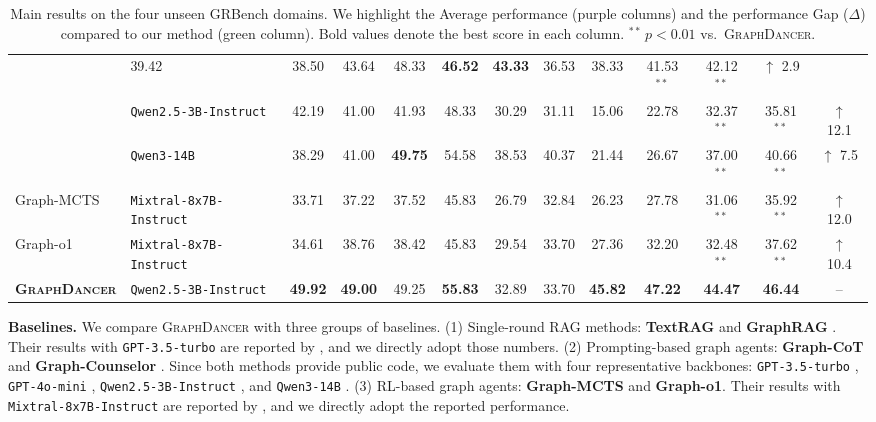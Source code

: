 \documentclass[11pt]{article}
\newcommand{\ours}{\textsc{GraphDancer}\xspace}
\newcommand{\sig}{\kern-0.5pt$^{{\scriptscriptstyle\ast\ast}}$}
\begin{document}
\begin{spacing}{0.985}
\begin{table}[ht]
{\begin{tabular}{llccccccccccc}
 & 39.42 & 38.50 & 43.64 & 48.33 & \textbf{46.52} & \textbf{43.33} & 36.53 & 38.33 & \cellcolor{violet!20}41.53\sig & \cellcolor{violet!20}42.12\sig & \cellcolor{darkgreen!5}$\uparrow$ 2.9 \\
 & \texttt{Qwen2.5-3B-Instruct}
 & 42.19 & 41.00 & 41.93 & 48.33 & 30.29 & 31.11 & 15.06 & 22.78 & \cellcolor{violet!20}32.37\sig & \cellcolor{violet!20}35.81\sig & \cellcolor{darkgreen!20}$\uparrow$ 12.1 \\
 & \texttt{Qwen3-14B}
 & 38.29 & 41.00 & \textbf{49.75} & 54.58 & 38.53 & 40.37 & 21.44 & 26.67 & \cellcolor{violet!20}37.00\sig & \cellcolor{violet!20}40.66\sig & \cellcolor{darkgreen!10}$\uparrow$ 7.5 \\
\midrule
Graph-MCTS \cite{liu2025graphmcts}
 & \texttt{Mixtral-8x7B-Instruct}
 & 33.71 & 37.22 & 37.52 & 45.83 & 26.79 & 32.84 & 26.23 & 27.78 & \cellcolor{violet!20}31.06\sig & \cellcolor{violet!20}35.92\sig & \cellcolor{darkgreen!25}$\uparrow$ 12.0 \\
Graph-o1 \cite{liu2025grapho1}
 & \texttt{Mixtral-8x7B-Instruct}
 & 34.61 & 38.76 & 38.42 & 45.83 & 29.54 & 33.70 & 27.36 & 32.20 & \cellcolor{violet!20}32.48\sig & \cellcolor{violet!20}37.62\sig & \cellcolor{darkgreen!20}$\uparrow$ 10.4 \\
\midrule
%
\textbf{\ours}
 & \texttt{Qwen2.5-3B-Instruct}
 & \textbf{49.92} & \textbf{49.00} & 49.25 & \textbf{55.83} & 32.89 & 33.70 & \textbf{45.82} & \textbf{47.22} & \cellcolor{violet!20}\textbf{44.47} & \cellcolor{violet!20}\textbf{46.44} & -- \\
\bottomrule
\end{tabular}
}
\vspace{-0.5em}
\caption{Main results on the four unseen GRBench domains. We highlight the Average performance (\colorbox{violet!20}{purple} columns) and the performance Gap ($\Delta$) compared to our method (\colorbox{darkgreen!20}{green} column). Bold values denote the best score in each column. $^{\ast\ast}$\,$p<0.01$ vs.\ \ours.}
\label{tab:main}
\vspace{-1em}
\end{table}

\smallskip
\noindent \textbf{Baselines.}
We compare \ours with three groups of baselines.
(1) Single-round RAG methods:
\textbf{TextRAG} \cite{gao2023retrieval} and \textbf{GraphRAG} \cite{ye2024language}.
Their results with \texttt{GPT-3.5-turbo} \cite{ouyang2022training} are reported by \citet{jin2024graph}, and we directly adopt those numbers.
(2) Prompting-based graph agents:
\textbf{Graph-CoT} \cite{jin2024graph} and \textbf{Graph-Counselor} \cite{gao2025graph}.
Since both methods provide public code, we evaluate them with four representative backbones:
\texttt{GPT-3.5-turbo} \cite{ouyang2022training},
\texttt{GPT-4o-mini} \cite{hurst2024gpt},
\texttt{Qwen2.5-3B-Instruct} \cite{hui2024qwen2}, and
\texttt{Qwen3-14B} \cite{yang2025qwen3}.
(3) RL-based graph agents:
\textbf{Graph-MCTS} and \textbf{Graph-o1}.
Their results with \texttt{Mixtral-8x7B-Instruct} \cite{jiang2024mixtral} are reported by \citet{liu2025grapho1}, and we directly adopt the reported performance.


\end{spacing}
\end{document}
